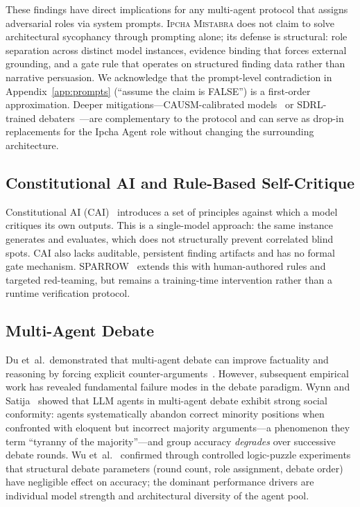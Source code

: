 \documentclass[11pt,a4paper]{article}
\newcommand{\methodname}{\textsc{Ipcha Mistabra}}
\begin{document}
These findings have direct implications for any multi-agent protocol that assigns adversarial roles via system prompts.
\methodname{} does not claim to solve architectural sycophancy through prompting alone; its defense is structural: role separation across distinct model instances, evidence binding that forces external grounding, and a gate rule that operates on structured finding data rather than narrative persuasion.
We acknowledge that the prompt-level contradiction in Appendix~\ref{app:prompts} (``assume the claim is FALSE'') is a first-order approximation.
Deeper mitigations---CAUSM-calibrated models~\cite{causm2025} or SDRL-trained debaters~\cite{sdrl2025}---are complementary to the protocol and can serve as drop-in replacements for the Ipcha Agent role without changing the surrounding architecture.

\subsection{Constitutional AI and Rule-Based Self-Critique}
Constitutional AI (CAI)~\cite{bai2022} introduces a set of principles against which a model critiques its own outputs.
This is a single-model approach: the same instance generates and evaluates, which does not structurally prevent correlated blind spots.
CAI also lacks auditable, persistent finding artifacts and has no formal gate mechanism.
SPARROW~\cite{sparrow2022} extends this with human-authored rules and targeted red-teaming, but remains a training-time intervention rather than a runtime verification protocol.

\subsection{Multi-Agent Debate}
\label{sec:mad}
Du et~al.\ demonstrated that multi-agent debate can improve factuality and reasoning by forcing explicit counter-arguments~\cite{du_multiagent_debate}.
However, subsequent empirical work has revealed fundamental failure modes in the debate paradigm.
Wynn and Satija~\cite{wynn2025} showed that LLM agents in multi-agent debate exhibit strong social conformity: agents systematically abandon correct minority positions when confronted with eloquent but incorrect majority arguments---a phenomenon they term ``tyranny of the majority''---and group accuracy \emph{degrades} over successive debate rounds.
Wu et~al.~\cite{wu2025_debate} confirmed through controlled logic-puzzle experiments that structural debate parameters (round count, role assignment, debate order) have negligible effect on accuracy; the dominant performance drivers are individual model strength and architectural diversity of the agent pool.
\end{document}
